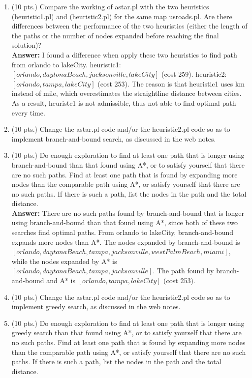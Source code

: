 \documentclass{article}%
\begin{document}
\begin{enumerate}
\begin{enumerate}
  		\item (10 pts.) Compare the working of astar.pl with the two heuristics (heuristic1.pl) and (heuristic2.pl) for the same map usroads.pl. Are there differences between the performance of the two heuristics (either the length of the paths or the number of nodes expanded before reaching the final solution)?\\
  		
  		\textbf{Answer:} I found a difference when apply these two heuristics to find path from orlando to lakeCity. heuristic1: $\left[orlando, daytonaBeach, jacksonville, lakeCity \right]$ (cost 259). heuristic2: $\left[orlando, tampa, lakeCity \right]$ (cost 253). The reason is that heuristic1 uses km instead of mile, which overestimates the straightline distance between cities. As a result, heuristc1 is not admissible, thus not able to find optimal path every time.
  		
  		\item (10 pts.) Change the astar.pl code and/or the heuristic2.pl code so as to implement branch-and-bound search, as discussed in the web notes.
  		\item (10 pts.) Do enough exploration to find at least one path that is longer using branch-and-bound than that found using A*, or to satisfy yourself that there are no such paths. Find at least one path that is found by expanding more nodes than the comparable path using A*, or satisfy yourself that there are no such paths. If there is such a path, list the nodes in the path and the total distance.\\
  		
  		\textbf{Answer:} There are no such paths found by branch-and-bound that is longer using branch-and-bound than that found using A*, since both of these two searches find optimal paths. From orlando to lakeCity, branch-and-bound expands more nodes than A*. The nodes expanded by branch-and-bound is \\ $\left[orlando, daytonaBeach, tampa, jacksonville, westPalmBeach,miami \right]$, while the nodes expanded by A* is $\left[orlando, daytonaBeach, tampa, jacksonville \right]$. The path found by branch-and-bound and A* is $\left[orlando, tampa, lakeCity \right]$ (cost 253).
  		
  		
  		\item (10 pts.) Change the astar.pl code and/or the heuristic2.pl code so as to implement greedy search, as discussed in the web notes.
  		\item (10 pts.) Do enough exploration to find at least one path that is longer using greedy search than that found using A*, or to satisfy yourself that there are no such paths. Find at least one path that is found by expanding more nodes than the comparable path using A*, or satisfy yourself that there are no such paths. If there is such a path, list the nodes in the path and the total distance.\\
  		

\end{enumerate}
\end{enumerate}
\end{document}
